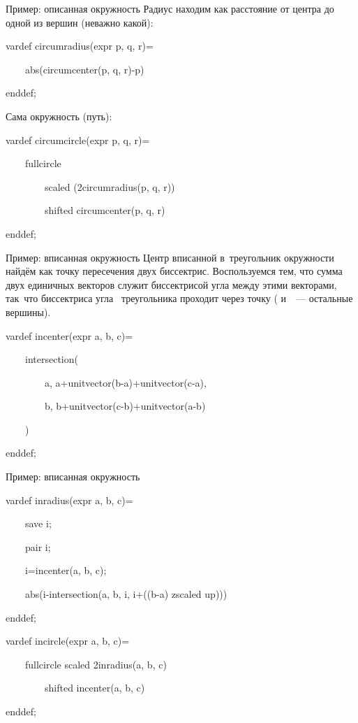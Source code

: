 \begin{frame}{Пример: описанная окружность}
Радиус находим как расстояние от центра до одной из вершин (неважно какой):
\begin{programlisting}
vardef circumradius(expr p, q, r)=\par
~~~~abs(circumcenter(p, q, r)-p)\par
enddef;
\end{programlisting}

Сама окружность (путь):
\begin{programlisting}
vardef circumcircle(expr p, q, r)=\par
~~~~fullcircle\par
~~~~~~~~scaled (2circumradius(p, q, r))\par
~~~~~~~~shifted circumcenter(p, q, r)\par
enddef;
\end{programlisting}
\end{frame}

\begin{frame}{Пример: вписанная окружность}
Центр вписанной в~треугольник окружности найдём как точку пересечения двух
биссектрис. Воспользуемся тем, что сумма двух единичных векторов служит
биссектрисой угла между этими векторами, так~что биссектриса угла~
треугольника проходит через точку 
( и~~— остальные вершины).
\begin{programlisting}
vardef incenter(expr a, b, c)=\par
~~~~intersection(\par
~~~~~~~~a, a+unitvector(b-a)+unitvector(c-a),\par
~~~~~~~~b, b+unitvector(c-b)+unitvector(a-b)\par
~~~~)\par
enddef;
\end{programlisting}
\end{frame}

\begin{frame}{Пример: вписанная окружность}
\begin{programlisting}
vardef inradius(expr a, b, c)=\par
~~~~save i;\par
~~~~pair i;\par
~~~~i=incenter(a, b, c);\par
~~~~abs(i-intersection(a, b, i, i+((b-a) zscaled up)))\par
enddef;
\end{programlisting}

\begin{programlisting}
vardef incircle(expr a, b, c)=\par
~~~~fullcircle scaled 2inradius(a, b, c)\par
~~~~~~~~shifted incenter(a, b, c)\par
enddef;
\end{programlisting}
\end{frame}


